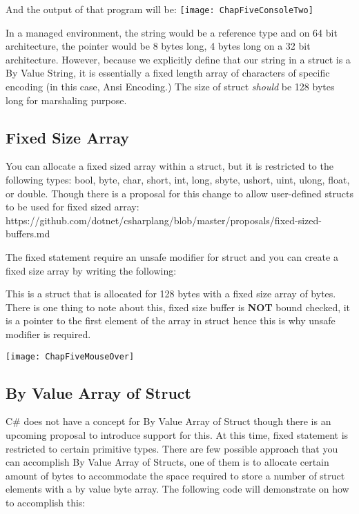 

And the output of that program will be:
\newline
\newline
\texttt{[image: ChapFiveConsoleTwo]}
\newpage

In a managed environment, the string would be a reference type and on 64 bit architecture, the pointer would be 8 bytes long, 4 bytes long on a 32 bit architecture. However, because we explicitly define that our string in a struct is a By Value String, it is essentially a fixed length array of characters of specific encoding (in this case, Ansi Encoding.) The size of struct \textit{should} be 128 bytes long for marshaling purpose.

\subsection{Fixed Size Array}
You can allocate a fixed sized array within a struct, but it is restricted to the following types: bool, byte, char, short, int, long, sbyte, ushort, uint, ulong, float, or double. Though there is a proposal for this change to allow user-defined structs to be used for fixed sized array: \newline \newline
https://github.com/dotnet/csharplang/blob/master/proposals/fixed-sized-buffers.md
\newline \newline

The fixed statement require an unsafe modifier for struct and you can create a fixed size array by writing the following:



This is a struct that is allocated for 128 bytes with a fixed size array of bytes. There is one thing to note about this, fixed size buffer is \textbf{NOT} bound checked, it is a pointer to the first element of the array in struct hence this is why unsafe modifier is required.

\texttt{[image: ChapFiveMouseOver]}
\newpage

\subsection{By Value Array of Struct}
C\# does not have a concept for By Value Array of Struct though there is an upcoming proposal to introduce support for this. At this time, fixed statement is restricted to certain primitive types. There are few possible approach that you can accomplish By Value Array of Structs, one of them is to allocate certain amount of bytes to accommodate the space required to store a number of struct elements with a by value byte array. The following code will demonstrate on how to accomplish this:

